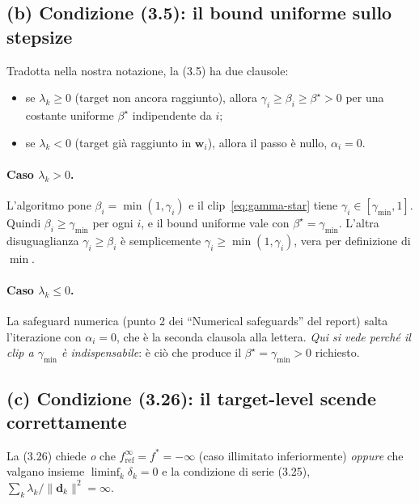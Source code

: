 \documentclass[11pt,a4paper]{article}
\theoremstyle{definition}
\newcommand{\w}{\bm{w}}
\newcommand{\dvec}{\bm{d}}
\newcommand{\fstar}{f^{*}}
\newcommand{\gmin}{\gamma_{\min}}
\newcommand{\norm}[1]{\lVert #1\rVert}
\begin{document}
\subsection{(b) Condizione (3.5): il bound uniforme sullo stepsize}
\label{sub:cond35}

Tradotta nella nostra notazione, la (3.5) ha due clausole:
\begin{itemize}[leftmargin=1.4em]
\item se $\lambda_k\ge0$ (target non ancora raggiunto), allora
$\gamma_i\ge\beta_i\ge\beta^\star>0$ per una costante uniforme $\beta^\star$ indipendente da
$i$;
\item se $\lambda_k<0$ (target già raggiunto in $\w_i$), allora il passo è nullo,
$\alpha_i=0$.
\end{itemize}

\paragraph{Caso $\lambda_k>0$.} L'algoritmo pone $\beta_i=\min(1,\gamma_i)$ e il
clip~\eqref{eq:gamma-star} tiene $\gamma_i\in[\gmin,1]$. Quindi $\beta_i\ge\gmin$ per ogni $i$,
e il bound uniforme vale con $\boxed{\beta^\star=\gmin}$. L'altra disuguaglianza
$\gamma_i\ge\beta_i$ è semplicemente $\gamma_i\ge\min(1,\gamma_i)$, vera per definizione di
$\min$.

\paragraph{Caso $\lambda_k\le0$.} La safeguard numerica (punto 2 dei ``Numerical safeguards''
del report) salta l'iterazione con $\alpha_i=0$, che è la seconda clausola alla lettera.
\emph{Qui si vede perché il clip a $\gmin$ è indispensabile}: è ciò che produce il
$\beta^\star=\gmin>0$ richiesto.

\subsection{(c) Condizione (3.26): il target-level scende correttamente}
\label{sub:cond326}

La (3.26) chiede \emph{o} che $f^\infty_{\mathrm{ref}}=\fstar=-\infty$ (caso illimitato
inferiormente) \emph{oppure} che valgano insieme $\liminf_k\delta_k=0$ e la condizione di
serie (3.25), $\sum_k\lambda_k/\norm{\dvec_k}^2=\infty$.
\end{document}

